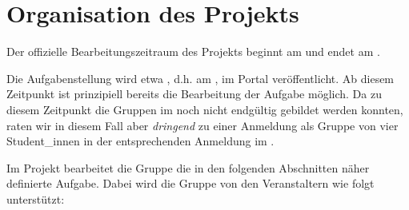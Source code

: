\section{Organisation des Projekts}
\label{sec:orga}

Der offizielle Bearbeitungszeitraum des Projekts beginnt am \emph{\beginDate} und endet am \emph{\finishDate}. 
\myRegister

Die Aufgabenstellung wird etwa \myAvailable, d.h. am \emph{\publishDate}, im Portal ver\"offentlicht. Ab
diesem Zeitpunkt ist prinzipiell bereits die Bearbeitung der Aufgabe m\"oglich. Da zu diesem 
Zeitpunkt die Gruppen im \regSystem noch nicht endg\"ultig gebildet werden konnten, raten wir 
in diesem Fall aber \emph{dringend} zu einer Anmeldung als Gruppe von vier Student\_innen
in der entsprechenden Anmeldung im \regSystem.

Im Projekt bearbeitet die Gruppe die in den folgenden Abschnitten n\"aher definierte Aufgabe. Dabei wird die Gruppe von den Veranstaltern wie folgt unterst\"utzt:

